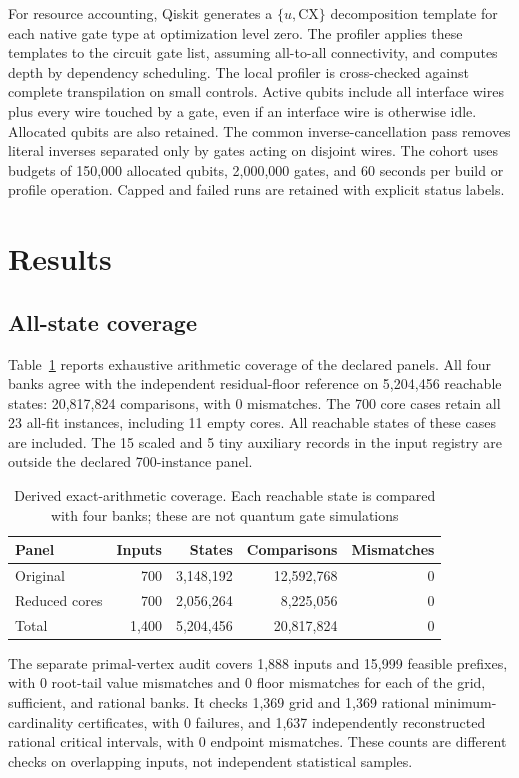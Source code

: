 \documentclass[referee,pdflatex,sn-mathphys-num]{sn-jnl}
\theoremstyle{thmstyleone}
\theoremstyle{thmstyletwo}
\begin{document}
For resource accounting, Qiskit generates a $\{u,\mathrm{CX}\}$ decomposition template for each native gate type at optimization level zero. The profiler applies these templates to the circuit gate list, assuming all-to-all connectivity, and computes depth by dependency scheduling. The local profiler is cross-checked against complete transpilation on small controls. Active qubits include all interface wires plus every wire touched by a gate, even if an interface wire is otherwise idle. Allocated qubits are also retained. The common inverse-cancellation pass removes literal inverses separated only by gates acting on disjoint wires. The cohort uses budgets of 150,000 allocated qubits, 2,000,000 gates, and 60 seconds per build or profile operation. Capped and failed runs are retained with explicit status labels.

\section{Results}\label{sec:results}
\subsection{All-state coverage}
Table~\ref{tab:coverage} reports exhaustive arithmetic coverage of the declared panels. All four banks agree with the independent residual-floor reference on 5,204,456 reachable states: 20,817,824 comparisons, with 0 mismatches. The 700 core cases retain all 23 all-fit instances, including 11 empty cores. All reachable states of these cases are included. The 15 scaled and 5 tiny auxiliary records in the input registry are outside the declared 700-instance panel.

\begin{table}[t]
\caption{Derived exact-arithmetic coverage. Each reachable state is compared with four banks; these are not quantum gate simulations}\label{tab:coverage}
\centering\small
\begin{tabular}{lrrrr}
\toprule
Panel & Inputs & States & Comparisons & Mismatches\\
\midrule
Original & 700 & 3,148,192 & 12,592,768 & 0\\
Reduced cores & 700 & 2,056,264 & 8,225,056 & 0\\
Total & 1,400 & 5,204,456 & 20,817,824 & 0\\
\bottomrule
\end{tabular}
\end{table}

The separate primal-vertex audit covers 1,888 inputs and 15,999 feasible prefixes, with 0 root-tail value mismatches and 0 floor mismatches for each of the grid, sufficient, and rational banks. It checks 1,369 grid and 1,369 rational minimum-cardinality certificates, with 0 failures, and 1,637 independently reconstructed rational critical intervals, with 0 endpoint mismatches. These counts are different checks on overlapping inputs, not independent statistical samples.
\end{document}
